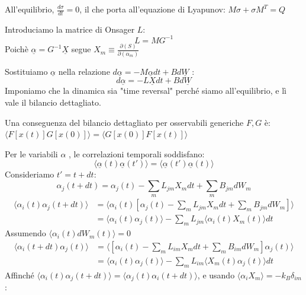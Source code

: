 \noindent All'equilibrio, $\frac{d\sigma}{dt}=0$, il che porta all'equazione di Lyapunov: $M\sigma + \sigma M^T = Q$

\noindent Introduciamo la matrice di Onsager $L$:
\begin{equation}
L = MG^{-1}
\end{equation}
Poichè $\underline{\alpha} = G^{-1} \underline{X}$ segue $X_{m} \equiv \frac{\partial(S)}{\partial(\alpha_m)}$

\noindent Sostituiamo $\underline{\alpha}$ nella relazione $d\underline{\alpha}=-M\underline{\alpha}dt+Bd\underline{W}$ :
\begin{equation}
d\underline{\alpha} = -L\underline{X}dt + Bd\underline{W} 
\end{equation}
Imponiamo che la dinamica sia "time reversal" perché siamo all'equilibrio, e lì vale il bilancio dettagliato.

\noindent Una conseguenza del bilancio dettagliato per osservabili generiche $F, G$ è:
$\langle F[x(t)]G[x(0)]\rangle = \langle G[x(0)]F[x(t)]\rangle$

\noindent Per le variabili $\alpha$ , le correlazioni temporali soddisfano:
\begin{equation}
\langle \underline{\alpha}(t)\underline{\alpha}(t')\rangle = \langle \underline{\alpha}(t')\underline{\alpha}(t)\rangle 
\end{equation}
Consideriamo $t'=t+dt$:
\begin{equation} 
\alpha_{j}(t+dt)=\alpha_{j}(t)-\sum_m L_{jm}X_{m}dt+\sum_m B_{jm}dW_{m} 
\end{equation}
\begin{align} 
\langle\alpha_{i}(t)\alpha_{j}(t+dt)\rangle &= \langle\alpha_{i}(t) [ \alpha_{j}(t)-\sum_m L_{jm}X_{m}dt+\sum_m B_{jm}dW_{m} ] \rangle \nonumber\\ 
&= \langle\alpha_{i}(t)\alpha_{j}(t)\rangle - \sum_m L_{jm}\langle\alpha_{i}(t)X_{m}(t)\rangle dt  
\end{align}
Assumendo $\langle \alpha_i(t) dW_m(t) \rangle = 0$
\begin{align} 
\langle\alpha_{i}(t+dt)\alpha_{j}(t)\rangle &= \langle [ \alpha_{i}(t)-\sum_m L_{im}X_{m}dt+\sum_m B_{im}dW_{m} ] \alpha_{j}(t) \rangle \nonumber \\ 
&= \langle\alpha_{i}(t)\alpha_{j}(t)\rangle - \sum_m L_{im}\langle X_{m}(t)\alpha_{j}(t)\rangle dt
\end{align}
Affinché $\langle\alpha_{i}(t)\alpha_{j}(t+dt)\rangle = \langle\alpha_{j}(t)\alpha_{i}(t+dt)\rangle$, e usando $\langle \alpha_i X_m \rangle = -k_B \delta_{im}$:

